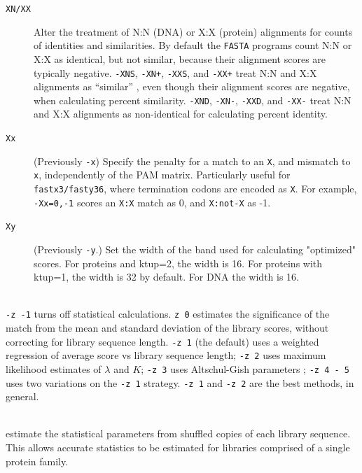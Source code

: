 \documentclass[11pt]{article}
\begin{document}
\begin{description}
\begin{description}
\item[\texttt{XN/XX}] Alter the treatment of N:N (DNA) or X:X
  (protein) alignments for counts of identities and similarities. By
  default the \texttt{FASTA} programs count N:N or X:X as identical,
  but not similar, because their alignment scores are typically
  negative. \texttt{-XNS}, \texttt{-XN+}, \texttt{-XXS}, and
  \texttt{-XX+} treat N:N and X:X alignments as ``similar'' , even
  though their alignment scores are negative, when calculating percent
  similarity. \texttt{-XND}, \texttt{-XN-}, \texttt{-XXD}, and
  \texttt{-XX-} treat N:N and X:X alignments as non-identical for
  calculating percent identity.

\item[\texttt{Xx}] (Previously \texttt{-x}) Specify the penalty for a
  match to an \texttt{X}, and mismatch to \texttt{x}, independently of
  the PAM matrix.  Particularly useful for \texttt{fastx3/fasty36},
  where termination codons are encoded as \texttt{X}.  For example,
  \texttt{-Xx=0,-1} scores an \texttt{X:X} match as 0, and
  \texttt{X:not-X} as -1.

\item[\texttt{Xy}] (Previously \texttt{-y}.) Set the width of the band
  used for calculating "optimized" scores.  For proteins and ktup=2,
  the width is 16.  For proteins with ktup=1, the width is 32 by
  default.  For DNA the width is 16.

\end{description}

\item[\texttt{-z -1,0,1,2,3,4,5,6}]\hfill\\
\texttt{-z -1} turns off statistical calculations. \texttt{z 0} estimates
the significance of the match from the mean and standard deviation of
the library scores, without correcting for library sequence length.
\texttt{-z 1} (the default) uses a weighted regression of average score
vs library sequence length; \texttt{-z 2} uses maximum likelihood
estimates of $\lambda$
and $K$; \texttt{-z 3} uses Altschul-Gish parameters \cite{alt960};
\texttt{-z 4 - 5} uses two variations on the \texttt{-z 1}
strategy. \texttt{-z 1} and \texttt{-z 2} are the best methods, in
general.
\item[\texttt{-z 11,12,14,15,16}]\hfill\\
estimate the statistical parameters from shuffled copies of each
library sequence.  This allows accurate statistics to be estimated for libraries comprised of a single protein family.


\end{description}
\end{document}
